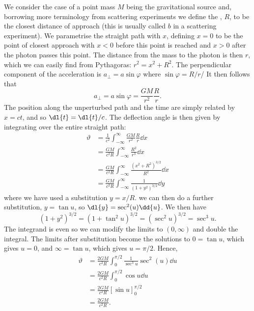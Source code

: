 \documentclass[fleqn]{NotesClass}
\begin{document}
    We consider the case of a point mass \(M\) being the gravitational source and, borrowing more terminology from scattering experiments we define the , \(R\), to be the closest distance of approach (this is usually called \(b\) in a scattering experiment).
    We parametrise the straight path with \(x\), defining \(x = 0\) to be the point of closest approach with \(x < 0\) before this point is reached and \(x > 0\) after the photon passes this point.
    The distance from the mass to the photon is then \(r\), which we can easily find from Pythagoras: \(r^2 = x^2 + R^2\).
    The perpendicular component of the acceleration is \(a_{\perp} = a\sin\varphi\) where \(\sin\varphi = R / r\)/
    It then follows that
    \begin{equation}
        a_{\perp} = a\sin\varphi = \frac{GM}{r^2} \frac{R}{r}.
    \end{equation}
    The position along the unperturbed path and the time are simply related by \(x = ct\), and so \(\dl{t} = \dl{t}/c\).
    The deflection angle is then given by integrating over the entire straight path:
    \begin{align}
        \vartheta &= \frac{1}{c^2}\int_{-\infty}^{\infty} \frac{GM}{r^2}\frac{R}{r} \dd{x}\\
        &= \frac{GM}{c^2R} \int_{-\infty}^{\infty} \frac{R^2}{r^3} \dd{x}\\
        &= \frac{GM}{c^2R} \int_{-\infty}^{\infty} \frac{(x^2 + R^2)^{3/2}}{R^2} \dd{x}\\
        &= \frac{GM}{c^2R} \int_{-\infty}^{\infty} \frac{1}{(1 + y^2)^{3/2}} \dd{y}
    \end{align}
    where we have used a substitution \(y = x/R\).
    we can then do a further substitution, \(y = \tan u\), so \(\dl{y} = \sec^2(u) \dd{u}\).
    We then have
    \begin{equation}
        (1 + y^2)^{3/2} = (1 + \tan^2 u)^{3/2} = (\sec^2 u)^{3/2} = \sec^3u.
    \end{equation}
    The integrand is even so we can modify the limits to \((0, \infty)\) and double the integral.
    The limits after substitution become the solutions to \(0 = \tan u\), which gives \(u = 0\), and \(\infty = \tan u\), which gives \(u = \pi/2\).
    Hence,
    \begin{align}
        \vartheta &= \frac{2GM}{c^2R} \int_{0}^{\pi/2} \frac{1}{\sec^3 u} \sec^2(u) \dd{u}\\
        &= \frac{2GM}{c^2R} \int_{0}^{\pi/2} \cos u \dd{u}\\
        &= \frac{2GM}{c^2R}[\sin u]_{0}^{\pi/2}\\
        &= \frac{2GM}{c^2R}.
    \end{align}
    
\end{document}
